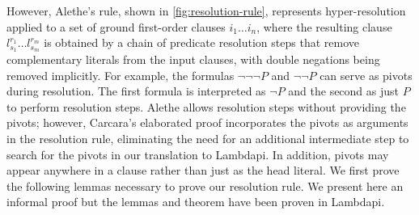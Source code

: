 However, Alethe's  rule, shown in \cref{fig:resolution-rule}, represents hyper-resolution applied to a set of ground first-order clauses $i_1 \dots i_n$,
where the resulting clause $l_{s_1}^{r_1} \dots l_{s_m}^{r_m}$ is obtained by a chain of predicate resolution steps that remove complementary literals from the input clauses, with double negations being removed implicitly.
For example, the formulas $\neg \neg \neg P$ and $\neg \neg P$ can serve as pivots during resolution.
The first formula is interpreted as $\neg P$ and the second as just $P$ to perform resolution steps.
Alethe allows resolution steps without providing the pivots; however, Carcara's elaborated proof incorporates the pivots as arguments in the resolution rule, eliminating the need for an additional intermediate step to search for the pivots in our translation to Lambdapi.
In addition, pivots may appear anywhere in a clause rather than just as the head literal.
We first prove the following lemmas necessary to prove our resolution rule. We present here an informal proof but the lemmas and theorem have been proven in Lambdapi.

